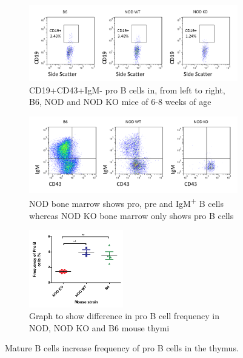 \begin{figure}
	\begin{subfigure}{\textwidth}
	\includegraphics[width=\textwidth]{Figures/MatureBincproB.png}
	\caption{CD19+CD43+IgM- pro B cells in, from left to right, B6, NOD and NOD KO mice of 6-8 weeks of age}
	\end{subfigure}
	\begin{subfigure}{\textwidth}
	\centering
	\includegraphics[width=\textwidth]{Figures/B6NODKOBM.png}
	\caption{NOD bone marrow shows pro, pre and IgM\textsuperscript{+} B cells whereas NOD KO bone marrow only shows pro B cells}
	\label{subfig:KOBM}
	\end{subfigure}
	\begin{subfigure}{\textwidth}
	\centering
	\includegraphics[width=0.45\textwidth]{Figures/MatureBincproBgraph.pdf}
	\caption{Graph to show difference in pro B cell frequency in NOD, NOD KO and B6 mouse thymi}
	\label{subfig:MatureBincproBgraph}
	\end{subfigure}
\caption[NOD mice have an increased frequency of pro B cells compared to NOD KO thymi]{Mature B cells increase frequency of pro B cells in the thymus.
}
\end{figure}
